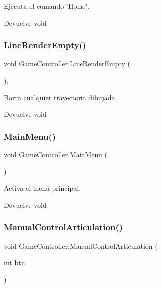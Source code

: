 Ejecuta el comando \char`\"{}\+Home\char`\"{}. \begin{DoxyReturn}{Devuelve}
void 
\end{DoxyReturn}
\mbox{\label{class_game_controller_a4156d664c9b3dce275af61bff2c00a69}} 
\subsubsection{\texorpdfstring{LineRenderEmpty()}{LineRenderEmpty()}}
{\footnotesize\ttfamily void Game\+Controller.\+Line\+Render\+Empty (\begin{DoxyParamCaption}{ }\end{DoxyParamCaption})\hspace{0.3cm}{\ttfamily [inline]}, {\ttfamily [private]}}

Borra cualquier trayectoria dibujada. \begin{DoxyReturn}{Devuelve}
void 
\end{DoxyReturn}
\mbox{\label{class_game_controller_aae26868d4e9c6e735d5fef9cc7b15bb1}} 
\subsubsection{\texorpdfstring{MainMenu()}{MainMenu()}}
{\footnotesize\ttfamily void Game\+Controller.\+Main\+Menu (\begin{DoxyParamCaption}{ }\end{DoxyParamCaption})\hspace{0.3cm}{\ttfamily [inline]}}

Activa el menú principal. \begin{DoxyReturn}{Devuelve}
void 
\end{DoxyReturn}
\mbox{\label{class_game_controller_af2f693d76f1b9bf4ff0403802ad44cae}} 
\subsubsection{\texorpdfstring{ManualControlArticulation()}{ManualControlArticulation()}}
{\footnotesize\ttfamily void Game\+Controller.\+Manual\+Control\+Articulation (\begin{DoxyParamCaption}\item[{int}]{btn }\end{DoxyParamCaption})\hspace{0.3cm}{\ttfamily [inline]}}

